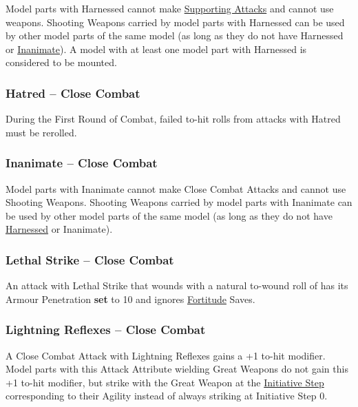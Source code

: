 Model parts with Harnessed cannot make \hyperref[supporting_attacks]{Supporting Attacks} and cannot use weapons. Shooting Weapons carried by model parts with Harnessed can be used by other model parts of the same model (as long as they do not have Harnessed or \hyperref[inanimate]{Inanimate}). A model with at least one model part with Harnessed is considered to be mounted.

\subsubsection{Hatred -- Close Combat}
\idx[main=y]{\hatred}\label{hatred}

During the First Round of Combat, failed to-hit rolls from attacks with Hatred must be rerolled.

\subsubsection{Inanimate -- Close Combat}
\idx[main=y]{\inanimate}\label{inanimate}

Model parts with Inanimate cannot make Close Combat Attacks and cannot use Shooting Weapons. Shooting Weapons carried by model parts with Inanimate can be used by other model parts of the same model (as long as they do not  have \hyperref[harnessed]{Harnessed} or Inanimate).

\subsubsection{Lethal Strike -- Close Combat}
\label{lethal_strike}

An attack with Lethal Strike that wounds with a natural to-wound roll of  has its Armour Penetration \textbf{set} to 10 and ignores \hyperref[fortitude]{Fortitude} Saves.

\subsubsection{Lightning Reflexes -- Close Combat}
\idx[main=y]{\lightningreflexes}\label{lightning_reflexes}

A Close Combat Attack with Lightning Reflexes gains a +1 to-hit modifier. Model parts with this Attack Attribute wielding Great Weapons do not gain this +1 to-hit modifier, but strike with the Great Weapon at the \hyperref[initiative_order]{Initiative Step} corresponding to their Agility instead of always striking at Initiative Step 0.

